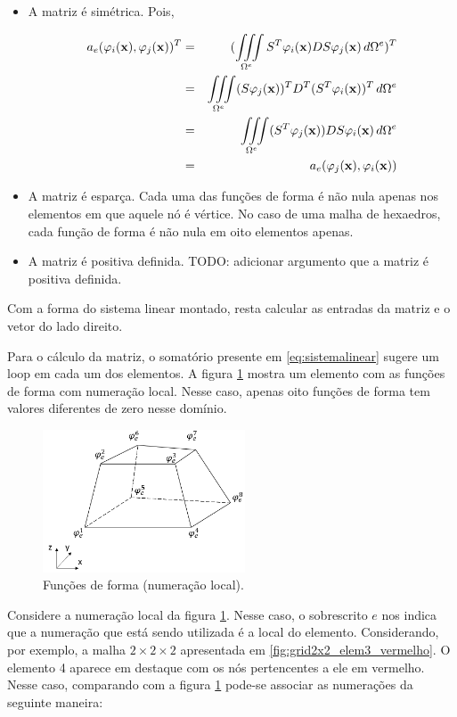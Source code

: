 \begin{itemize}
    \item A matriz é simétrica. Pois, 
    
    \begin{eqnarray}
    a_e(\varphi_i(\mathbf{x}),\varphi_j(\mathbf{x}))^T & = & (\iiint\limits_{\Omega^e} S^T\varphi_i(\mathbf{x}) D S\varphi_j(\mathbf{x}) \, d\Omega^e)^T \\
                         & = & \iiint\limits_{\Omega^e} (S\varphi_j(\mathbf{x}))^T D^T (S^T\varphi_i(\mathbf{x}))^T \, d\Omega^e \\
                         & = & \iiint\limits_{\Omega^e} (S^T\varphi_j(\mathbf{x})) D S \varphi_i(\mathbf{x}) \, d\Omega^e \\
                         & = & a_e(\varphi_j(\mathbf{x}),\varphi_i(\mathbf{x})) 
    \end{eqnarray}    
    
    \item A matriz é esparça. Cada uma das funções de forma é não nula apenas nos elementos em que aquele nó é vértice. No caso de uma malha de hexaedros, cada função de forma é não nula em oito elementos apenas. 
    
    \item A matriz é positiva definida. {\color{red}TODO: adicionar argumento que a matriz é positiva definida.}
\end{itemize}

Com a forma do sistema linear montado, resta calcular as entradas da matriz e o vetor do lado direito.

Para o cálculo da matriz, o somatório presente em \ref{eq:sistemalinear} sugere um loop em cada um dos elementos. A figura \ref{fig:elem_func_form_local} mostra um elemento com as funções de forma com numeração local. Nesse caso, apenas oito funções de forma tem valores diferentes de zero nesse domínio. 

\begin{figure}[!htbp]
\label{fig:elem_func_form_local}
\centering
\includegraphics[width=6cm]{chap01/elemento_original_func_forma.png}
\caption{Funções de forma (numeração local).}
\end{figure}


Considere a numeração local da figura \ref{fig:elem_func_form_local}. Nesse caso, o sobrescrito $e$ nos indica que a numeração que está sendo utilizada é a local do elemento. Considerando, por exemplo, a malha $2\times2\times2$ apresentada em \ref{fig:grid2x2_elem3_vermelho}. O elemento 4 aparece em destaque com os nós pertencentes a ele em vermelho. Nesse caso, comparando com a figura \ref{fig:elem_func_form_local} pode-se associar as numerações da seguinte maneira:

